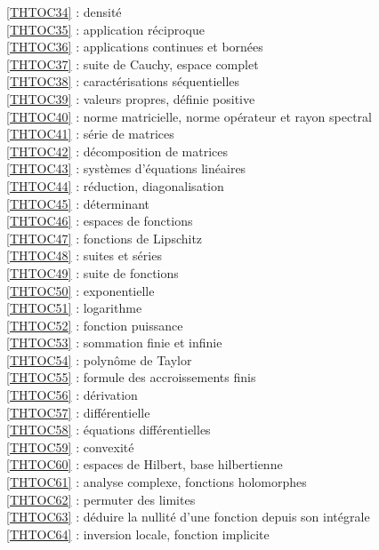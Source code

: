 \ref {THTOC34} : densité\\
\ref {THTOC35} : application réciproque\\
\ref {THTOC36} : applications continues et bornées\\
\ref {THTOC37} : suite de Cauchy, espace complet\\
\ref {THTOC38} : caractérisations séquentielles\\
\ref {THTOC39} : valeurs propres, définie positive\\
\ref {THTOC40} : norme matricielle, norme opérateur et rayon spectral\\
\ref {THTOC41} : série de matrices\\
\ref {THTOC42} : décomposition de matrices\\
\ref {THTOC43} : systèmes d'équations linéaires\\
\ref {THTOC44} : réduction, diagonalisation\\
\ref {THTOC45} : déterminant\\
\ref {THTOC46} : espaces de fonctions\\
\ref {THTOC47} : fonctions de Lipschitz\\
\ref {THTOC48} : suites et séries\\
\ref {THTOC49} : suite de fonctions\\
\ref {THTOC50} : exponentielle\\
\ref {THTOC51} : logarithme\\
\ref {THTOC52} : fonction puissance\\
\ref {THTOC53} : sommation finie et infinie\\
\ref {THTOC54} : polynôme de Taylor\\
\ref {THTOC55} : formule des accroissements finis\\
\ref {THTOC56} : dérivation\\
\ref {THTOC57} : différentielle\\
\ref {THTOC58} : équations différentielles\\
\ref {THTOC59} : convexité\\
\ref {THTOC60} : espaces de Hilbert, base hilbertienne\\
\ref {THTOC61} : analyse complexe, fonctions holomorphes\\
\ref {THTOC62} : permuter des limites\\
\ref {THTOC63} : déduire la nullité d'une fonction depuis son intégrale\\
\ref {THTOC64} : inversion locale, fonction implicite\\
